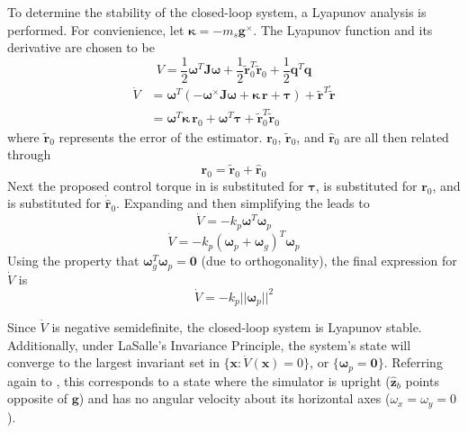 To determine the stability of the closed-loop system, a Lyapunov analysis is performed. For convienience, let $\bm{\kappa}=-m_s\bm{g}^{\times}$. The Lyapunov function and its derivative are chosen to be 
\begin{equation}
    {V} = \frac{1}{2}\bm{\omega}^T\bm{J\omega} + \frac{1}{2}\tilde{\bm{r}}_0^T\tilde{\bm{r}}_0 + \frac{1}{2}\bm{q}^T\bm{q}
\end{equation}
\begin{align}
    \dot{V} &= \bm{\omega}^T(-\bm{\omega}^\times \bm{J\omega} 
    +{\bm{\kappa\,r}} + \bm{\tau}) 
    + \tilde{\bm{r}}^T\dot{\tilde{\bm{r}}} \\
    &= \bm{\omega}^T\bm{\kappa\,r}_0+\bm{\omega}^T\bm{\tau}
    + \tilde{\bm{r}}_0^T\dot{\tilde{\bm{r}}}_0
\end{align}
where $\tilde{\bm{r}}_0$ represents the error of the estimator. $\bm{r}_0$, $\tilde{\bm{r}}_0$, and $\hat{\bm{r}}_0$ are all then related through
\begin{equation}\label{equation:r_relations}
    \bm{r}_0= \tilde{\bm{r}}_0+\hat{\bm{r}}_0
\end{equation} 
Next the proposed control torque in  is substituted for $\bm{\tau}$,  is substituted for $\bm{r}_0$, and  is substituted for $\dot{\hat{\bm{r}}}_0$. Expanding and then simplifying the leads to
\begin{equation}
    \dot{V} = -k_p\bm{\omega}^T\bm{\omega}_p
\end{equation}
\begin{equation}
    \dot{V} = -k_p(\bm{\omega}_p+\bm{\omega}_g)^T\bm{\omega}_p
\end{equation}
Using the property that $\bm{\omega}_g^T\bm{\omega}_p=\bm{0}$ (due to orthogonality), the final expression for $\dot{V}$ is
\begin{equation}\label{equation:final_V_dot}
    \dot{V} = -k_p||\bm{\omega}_p||^2
\end{equation}

Since $\dot{V}$ is negative semidefinite, the closed-loop system is Lyapunov stable. Additionally, under LaSalle's Invariance Principle, the system's state will converge to the largest invariant set in $\{\bm{x}:\dot V(\bm{x})=0 \}$, or $\{\bm{\omega}_p=\bm{0}\}$. Referring again to , this corresponds to a state where the simulator is upright ($\hat{\bm{z}}_b$ points opposite of $\bm{g}$) and has no angular velocity about its horizontal axes ($\omega_x=\omega_y=0$). 

